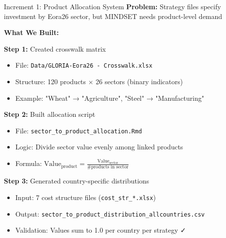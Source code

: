 \documentclass[10pt]{beamer}
\begin{document}
\begin{frame}[fragile]{Increment 1: Product Allocation System}
\textbf{Problem:} Strategy files specify investment by Eora26 sector, but MINDSET needs product-level demand

\vspace{0.3cm}

\textbf{What We Built:}

\vspace{0.2cm}

\textbf{Step 1:} Created crosswalk matrix
\begin{itemize}
    \item File: \texttt{Data/GLORIA-Eora26 - Crosswalk.xlsx}
    \item Structure: 120 products $\times$ 26 sectors (binary indicators)
    \item Example: "Wheat" → "Agriculture", "Steel" → "Manufacturing"
\end{itemize}

\vspace{0.2cm}

\textbf{Step 2:} Built allocation script
\begin{itemize}
    \item File: \texttt{sector\_to\_product\_allocation.Rmd}
    \item Logic: Divide sector value evenly among linked products
    \item Formula: $\text{Value}_{\text{product}} = \frac{\text{Value}_{\text{sector}}}{\text{\# products in sector}}$
\end{itemize}

\vspace{0.2cm}

\textbf{Step 3:} Generated country-specific distributions
\begin{itemize}
    \item Input: 7 cost structure files (\texttt{cost\_str\_*.xlsx})
    \item Output: \texttt{sector\_to\_product\_distribution\_allcountries.csv}
    \item Validation: Values sum to 1.0 per country per strategy ✓
\end{itemize}

\end{frame}
\end{document}
